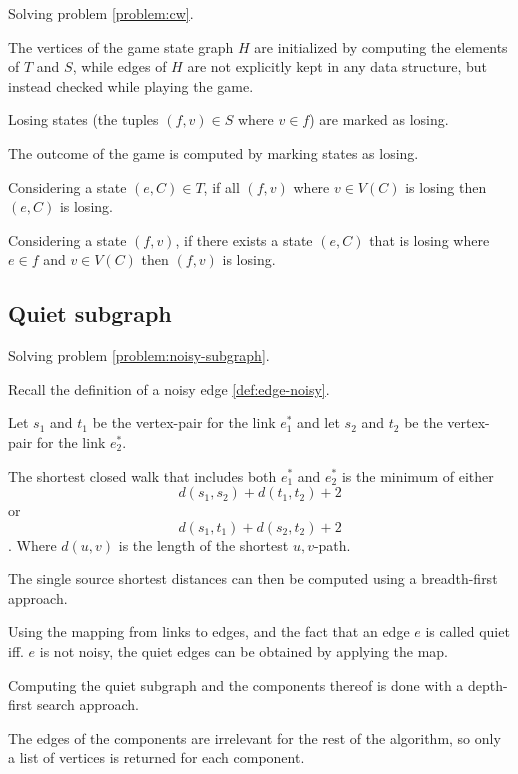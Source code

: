 \documentclass{article}
\begin{document}
		Solving problem \ref{problem:cw}.

		The vertices of the game state graph $H$ are initialized by computing the elements of $T$ and $S$, while edges of $H$ are not explicitly kept in any data structure, but instead checked while playing the game.

		Losing states (the tuples $(f,v) \in S$ where $v \in f$) are marked as losing.

		The outcome of the game is computed by marking states as losing.
		
		Considering a state $(e, C) \in T$, if all $(f, v)$ where $v \in V(C)$ is losing then $(e, C)$ is losing.

		Considering a state $(f, v)$, if there exists a state $(e, C)$ that is losing where $e \in f$ and $v \in V(C)$ then $(f, v)$ is losing.


		\subsection{Quiet subgraph}

			Solving problem \ref{problem:noisy-subgraph}.

			Recall the definition of a noisy edge \ref{def:edge-noisy}.

			Let $s_1$ and $t_1$ be the vertex-pair for the link $e_1^*$ and let $s_2$ and $t_2$ be the vertex-pair for the link $e_2^*$.

			\begin{claim}
				The shortest closed walk that includes both $e_1^*$ and $e_2^*$ is the minimum of either $$d(s_1, s_2) + d(t_1, t_2) + 2$$ or $$d(s_1, t_1) + d(s_2, t_2) + 2$$. Where $d(u, v)$ is the length of the shortest $u,v$-path.
			\end{claim}

			The single source shortest distances can then be computed using a breadth-first approach.

			Using the mapping from links to edges, and the fact that an edge $e$ is called quiet iff. $e$ is not noisy, the quiet edges can be obtained by applying the map.

			Computing the quiet subgraph and the components thereof is done with a depth-first search approach.

			The edges of the components are irrelevant for the rest of the algorithm, so only a list of vertices is returned for each component.

\end{document}
